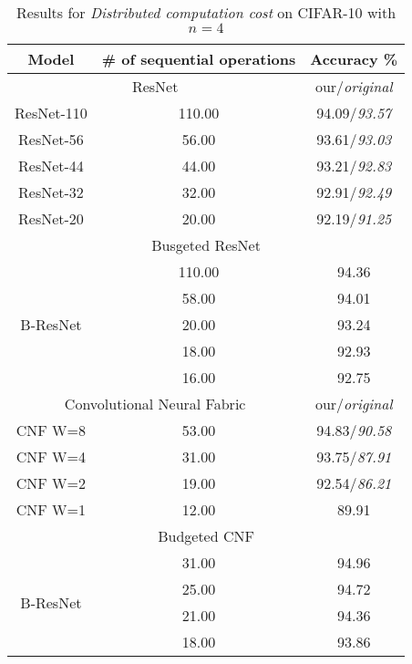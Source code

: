 \begin{table}[h]
\centering
\begin{tabular}{|c||cc|}
\hline
Model                       & \# of sequential operations & Accuracy \%  \\ \hline \hline
\multicolumn{2}{|c|}{ResNet \cite{DBLP:journals/corr/HeZRS15}}                              & our/\textit{original} \\ \hline
ResNet-110                  & 110.00                      & 94.09/\textit{93.57}  \\
ResNet-56                   & 56.00                       & 93.61/\textit{93.03}  \\
ResNet-44                   & 44.00                       & 93.21/\textit{92.83}  \\
ResNet-32                   & 32.00                       & 92.91/\textit{92.49}  \\
ResNet-20                   & 20.00                       & 92.19/\textit{91.25}  \\ \hline \hline
\multicolumn{3}{|c|}{Busgeted ResNet}                                    \\ \hline
\multirow{5}{*}{B-ResNet}                   & 110.00                      & 94.36        \\
		                    & 58.00                       & 94.01        \\
		                    & 20.00                       & 93.24        \\
		                    & 18.00                       & 92.93        \\
		                    & 16.00                       & 92.75        \\ \hline \hline
\multicolumn{2}{|c|}{Convolutional Neural Fabric \cite{DBLP:journals/corr/SaxenaV16}}         & our/\textit{original} \\ \hline
CNF W=8                     & 53.00                       & 94.83/\textit{90.58}  \\
CNF W=4                     & 31.00                       & 93.75/\textit{87.91}  \\
CNF W=2                     & 19.00                       & 92.54/\textit{86.21}  \\
CNF W=1                     & 12.00                       & 89.91        \\ \hline \hline
\multicolumn{3}{|c|}{Budgeted CNF}                                       \\ \hline
\multirow{4}{*}{B-ResNet}	& 31.00                       & 94.96        \\
		                    & 25.00                       & 94.72        \\
	                        & 21.00                       & 94.36        \\
	                        & 18.00                       & 93.86        \\ \hline
\end{tabular}
\caption{Results for \textit{Distributed computation cost} on CIFAR-10 with $n=4$}
\label{cif10_para4}
\end{table}